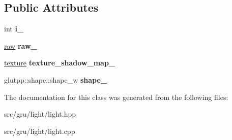 \subsection*{\-Public \-Attributes}
\begin{DoxyCompactItemize}
\item 
\hypertarget{classglutpp_1_1light_1_1light_afa7e0890ce66350d6adad22282ec4a19}{int {\bfseries i\-\_\-}}\label{classglutpp_1_1light_1_1light_afa7e0890ce66350d6adad22282ec4a19}

\item 
\hypertarget{classglutpp_1_1light_1_1light_ac919169305f5dc46e47073308b1d26e1}{\hyperlink{classglutpp_1_1light_1_1raw}{raw} {\bfseries raw\-\_\-}}\label{classglutpp_1_1light_1_1light_ac919169305f5dc46e47073308b1d26e1}

\item 
\hypertarget{classglutpp_1_1light_1_1light_a514b6b13118418366398118bb47291be}{\hyperlink{classglutpp_1_1texture}{texture} {\bfseries texture\-\_\-shadow\-\_\-map\-\_\-}}\label{classglutpp_1_1light_1_1light_a514b6b13118418366398118bb47291be}

\item 
\hypertarget{classglutpp_1_1light_1_1light_abc14ce2d7a706c4c77bf52c9f66692ca}{glutpp\-::shape\-::shape\-\_\-w {\bfseries shape\-\_\-}}\label{classglutpp_1_1light_1_1light_abc14ce2d7a706c4c77bf52c9f66692ca}

\end{DoxyCompactItemize}


\-The documentation for this class was generated from the following files\-:\begin{DoxyCompactItemize}
\item 
src/gru/light/light.\-hpp\item 
src/gru/light/light.\-cpp\end{DoxyCompactItemize}

